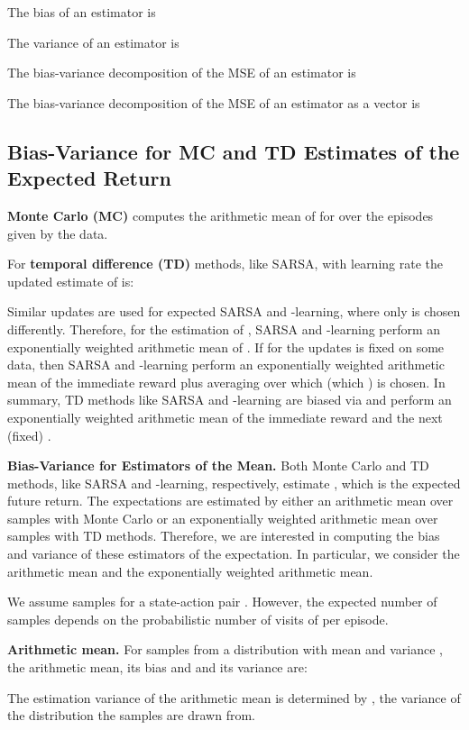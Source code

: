 \documentclass{article}
\begin{document}
\begin{appendices}
The bias of an estimator  is

The variance of an estimator  is

The bias-variance decomposition of the MSE of an estimator  is


The bias-variance decomposition of the MSE of an estimator
 as a vector is





\subsection{Bias-Variance for MC and TD Estimates of the Expected Return}
\label{sec:Abias_variance_estimator}

{\bf Monte Carlo (MC)} computes the arithmetic mean
 of  for  over the episodes
given by the data. 


For {\bf temporal difference (TD)} methods,
like SARSA, with learning rate  the updated estimate of  is:

Similar updates are used for expected SARSA and -learning, where
only  is chosen differently. 
Therefore,
for the estimation of , SARSA and -learning perform 
an exponentially weighted arithmetic mean of  .
If for the updates  is fixed on some data, then
SARSA and -learning perform an exponentially weighted arithmetic mean of the immediate
reward  plus averaging over which  (which ) is chosen.
In summary, TD methods like SARSA and -learning are biased via
 and perform an exponentially weighted arithmetic mean of the
immediate reward  and the next (fixed) .

{\bf Bias-Variance for Estimators of the Mean.}
Both Monte Carlo and TD methods, like SARSA and -learning, respectively, estimate
, which is the expected
future return. The expectations are estimated
by either an arithmetic mean over samples
with Monte Carlo or an exponentially weighted arithmetic mean over samples with TD methods.
Therefore, we are interested in computing the bias and variance of
these estimators of the expectation.
In particular, we consider the arithmetic mean and the
exponentially weighted arithmetic mean.

We assume  samples for a state-action pair . However, the expected
number of samples depends on the probabilistic number of visits of
 per episode. 

{\bf Arithmetic mean.}
For  samples  from a distribution with mean
 and variance , the arithmetic mean, its bias and and its variance are:

The estimation variance of the arithmetic mean is determined by ,
the variance of the distribution the samples are drawn from.


\end{appendices}
\end{document}
